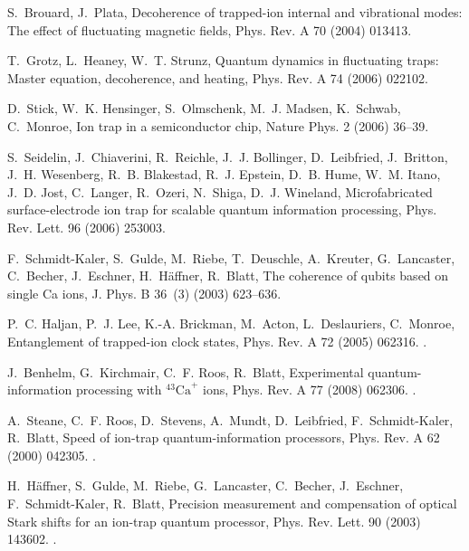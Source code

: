 \documentclass[3p,sort&compress,12pt]{elsarticle}
\begin{document}
\begin{thebibliography}{100}
S.~Brouard, J.~Plata, Decoherence of trapped-ion internal and vibrational
  modes: {T}he effect of fluctuating magnetic fields, Phys. Rev. A 70 (2004)
  013413.

T.~Grotz, L.~Heaney, W.~T. Strunz, Quantum dynamics in fluctuating traps:
  {M}aster equation, decoherence, and heating, Phys. Rev. A 74 (2006) 022102.

D.~Stick, W.~K. Hensinger, S.~Olmschenk, M.~J. Madsen, K.~Schwab, C.~Monroe,
  Ion trap in a semiconductor chip, Nature Phys. 2 (2006) 36--39.

S.~Seidelin, J.~Chiaverini, R.~Reichle, J.~J. Bollinger, D.~Leibfried,
  J.~Britton, J.~H. Wesenberg, R.~B. Blakestad, R.~J. Epstein, D.~B. Hume,
  W.~M. Itano, J.~D. Jost, C.~Langer, R.~Ozeri, N.~Shiga, D.~J. Wineland,
  Microfabricated surface-electrode ion trap for scalable quantum information
  processing, Phys. Rev. Lett. 96 (2006) 253003.

F.~Schmidt-Kaler, S.~Gulde, M.~Riebe, T.~Deuschle, A.~Kreuter, G.~Lancaster,
  C.~Becher, J.~Eschner, H.~H{\"a}ffner, R.~Blatt, The coherence of qubits
  based on single {Ca} ions, J. Phys. B 36~(3) (2003) 623--636.

P.~C. Haljan, P.~J. Lee, K.-A. Brickman, M.~Acton, L.~Deslauriers, C.~Monroe,
  Entanglement of trapped-ion clock states, Phys. Rev. A 72 (2005) 062316.
\newblock \href {http://dx.doi.org/10.1103/PhysRevA.72.062316}
  {}.

J.~Benhelm, G.~Kirchmair, C.~F. Roos, R.~Blatt, Experimental
  quantum-information processing with ${^{43}\text{C}\text{a}}^{+}$ ions, Phys.
  Rev. A 77 (2008) 062306.
\newblock \href {http://dx.doi.org/10.1103/PhysRevA.77.062306}
  {}.

A.~Steane, C.~F. Roos, D.~Stevens, A.~Mundt, D.~Leibfried, F.~Schmidt-Kaler,
  R.~Blatt, Speed of ion-trap quantum-information processors, Phys. Rev. A 62
  (2000) 042305.
\newblock \href {http://dx.doi.org/10.1103/PhysRevA.62.042305}
  {}.

H.~H\"affner, S.~Gulde, M.~Riebe, G.~Lancaster, C.~Becher, J.~Eschner,
  F.~Schmidt-Kaler, R.~Blatt, Precision measurement and compensation of optical
  {S}tark shifts for an ion-trap quantum processor, Phys. Rev. Lett. 90 (2003)
  143602.
\newblock \href {http://dx.doi.org/10.1103/PhysRevLett.90.143602}
  {}.


\end{thebibliography}
\end{document}
